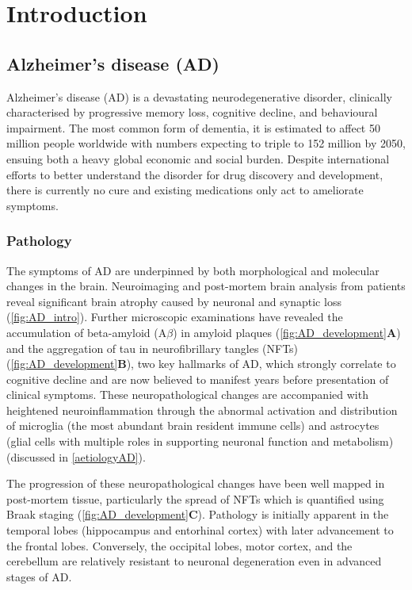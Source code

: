 \chapter{Introduction}

\section{Alzheimer's disease (AD)}

Alzheimer’s disease (AD) is a devastating neurodegenerative disorder, clinically characterised by progressive memory loss, cognitive decline, and behavioural impairment. The most common form of dementia, it is estimated to affect 50 million people worldwide with numbers expecting to triple to 152 million by 2050, ensuing both a heavy global economic and social burden\cite{International2020}. Despite international efforts to better understand the disorder for drug discovery and development, there is currently no cure and existing medications only act to ameliorate symptoms.

\subsection{Pathology}
\label{ch1: ad_pathology}
The symptoms of AD are underpinned by both morphological and molecular changes in the brain. Neuroimaging and post-mortem brain analysis from patients reveal significant brain atrophy caused by neuronal and synaptic loss\cite{Selkoe1991,Perl2010} (\cref{fig:AD_intro}). Further microscopic examinations have revealed the accumulation of beta-amyloid (A$\beta$) in amyloid plaques (\cref{fig:AD_development}\textbf{A}) and the aggregation of tau in neurofibrillary tangles (NFTs) (\cref{fig:AD_development}\textbf{B}), two key hallmarks of AD, which strongly correlate to cognitive decline and are now believed to manifest years before presentation of clinical symptoms\cite{Sperling2011}. These neuropathological changes are accompanied with heightened neuroinflammation through the abnormal activation and distribution of microglia (the most abundant brain resident immune cells) and astrocytes (glial cells with multiple roles in supporting neuronal function and metabolism) \cite{Heneka2015} (discussed in \cref{aetiologyAD}). 

The progression of these neuropathological changes have been well mapped in post-mortem tissue, particularly the spread of NFTs which is quantified using Braak staging\cite{H1991} (\cref{fig:AD_development}\textbf{C}). Pathology is initially apparent in the temporal lobes (hippocampus and entorhinal cortex) with later advancement to the frontal lobes. Conversely, the occipital lobes, motor cortex, and the cerebellum are relatively resistant to neuronal degeneration even in advanced stages of AD\cite{Xu2019}. 

